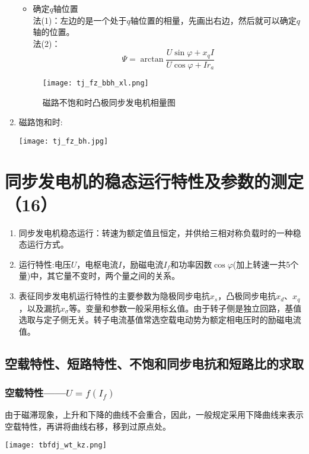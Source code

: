 \documentclass[blue]{elegantnote}
\begin{document}
\begin{enumerate}
	\begin{itemize}
		\item 确定$q$轴位置\\
		法(1)：左边的是一个处于$q$轴位置的相量，先画出右边，然后就可以确定$q$轴的位置。\\
		法(2)：$$\Psi=\arctan\frac{U\sin\varphi+x_qI}{U\cos\varphi+Ir_a}$$
	\end{itemize}   
	\begin{figure}[!hbtp]
		\centering
		\texttt{[image: tj\_fz\_bbh\_xl.png]}
		\caption{磁路不饱和时凸极同步发电机相量图}           \label{figur:tj_fz_bbh_xl}                           
	\end{figure}
	\item 磁路饱和时:
	\begin{center}
		\texttt{[image: tj\_fz\_bh.jpg]}                  
	\end{center}
\end{enumerate}

\chapter{同步发电机的稳态运行特性及参数的测定（16）}
\begin{enumerate}
	\item 同步发电机稳态运行：{\color{main}转速为额定值且恒定}，并供给{\color{main}三相对称负载}时的一种稳态运行方式。
	\item 运行特性:电压$U$，电枢电流$I$，励磁电流$I_f$和功率因数$\cos\varphi$(加上转速一共5个量)中，其它量不变时，两个量之间的关系。
	\item 表征同步发电机运行特性的主要参数为隐极同步电抗$x_s$，凸极同步电抗$x_d$、$x_q$，以及漏抗$x_{\sigma}$等。变量和参数一般采用{\color{blue}标幺值}。由于转子侧是独立回路，基值选取与定子侧无关。{\color{thid}转子电流基值常选空载电动势为额定相电压时的励磁电流值。}
\end{enumerate}

\section{空载特性、短路特性、不饱和同步电抗和短路比的求取}
\subsection{空载特性——$U=f(I_f)$}
由于磁滞现象，上升和下降的曲线不会重合，因此，一般规定采用下降曲线来表示空载特性，再讲将曲线右移，移到过原点处。
\begin{center}
	\texttt{[image: tbfdj\_wt\_kz.png]}                   
\end{center}
\end{document}
